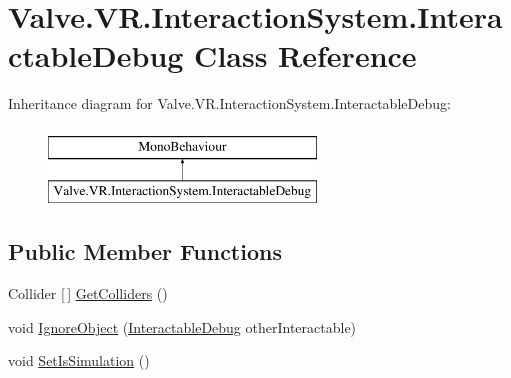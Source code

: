 \hypertarget{class_valve_1_1_v_r_1_1_interaction_system_1_1_interactable_debug}{}\section{Valve.\+V\+R.\+Interaction\+System.\+Interactable\+Debug Class Reference}
\label{class_valve_1_1_v_r_1_1_interaction_system_1_1_interactable_debug}
Inheritance diagram for Valve.\+V\+R.\+Interaction\+System.\+Interactable\+Debug\+:\begin{figure}[H]
\begin{center}
\leavevmode
\includegraphics[height=2.000000cm]{class_valve_1_1_v_r_1_1_interaction_system_1_1_interactable_debug}
\end{center}
\end{figure}
\subsection*{Public Member Functions}
\begin{DoxyCompactItemize}
\item 
Collider \mbox{[}$\,$\mbox{]} \mbox{\hyperlink{class_valve_1_1_v_r_1_1_interaction_system_1_1_interactable_debug_a0296a0694c187eafba022c9e92424f52}{Get\+Colliders}} ()
\item 
void \mbox{\hyperlink{class_valve_1_1_v_r_1_1_interaction_system_1_1_interactable_debug_a76540719a87638bb596e44730f48ea1b}{Ignore\+Object}} (\mbox{\hyperlink{class_valve_1_1_v_r_1_1_interaction_system_1_1_interactable_debug}{Interactable\+Debug}} other\+Interactable)
\item 
void \mbox{\hyperlink{class_valve_1_1_v_r_1_1_interaction_system_1_1_interactable_debug_a4be20dc8a66f6827ae70718d670992e2}{Set\+Is\+Simulation}} ()
\end{DoxyCompactItemize}
